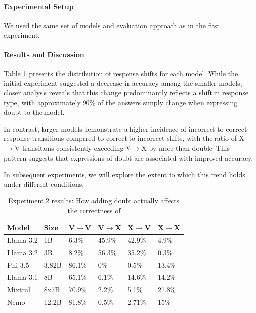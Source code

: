 \paragraph{Experimental Setup}
We used the same set of models and evaluation approach as in the first experiment.

\paragraph{Results and Discussion}

Table \ref{tab:accuracy_deep_dive} presents the distribution of response shifts for each model. While the initial experiment suggested a decrease in accuracy among the smaller models, closer analysis reveals that this change predominantly reflects a shift in response type, with approximately 90\% of the answers simply change when expressing doubt to the model.

In contrast, larger models demonstrate a higher incidence of incorrect-to-correct response transitions compared to correct-to-incorrect shifts, with the ratio of X$\rightarrow$V transitions consistently exceeding V$\rightarrow$X by more than double. This pattern suggests that expressions of doubt are associated with improved accuracy.

In subsequent experiments, we will explore the extent to which this trend holds under different conditions.

\begin{table}[h]
    \centering
    \small %
    \begin{tabular}{|l|l|l|l|l|l|}
        \hline
        \textbf{Model} & \textbf{Size} & \textbf{V$\rightarrow$V} & \textbf{V$\rightarrow$X} & \textbf{X$\rightarrow$V} & \textbf{X$\rightarrow$X} \\
        \hline
        Llama 3.2 & 1B  & 6.3\% & 45.9\% & 42.9\% & 4.9\%\\
        Llama 3.2 & 3B & 8.2\% & 56.3\% & 35.2\% & 0.3\%\\
        Phi 3.5 & 3.82B & 86.1\% & 0\% & 0.5\% & 13.4\%\\
        Llama 3.1 & 8B & 65.1\% & 6.1\% & 14.6\% & 14.2\% \\
        Mixtral & 8x7B &70.9\% & 2.2\% & 5.1\% & 21.8\% \\
        Nemo & 12.2B & 81.8\% & 0.5\% & 2.71\% & 15\%\\
        \hline
    \end{tabular}
    \caption{Experiment 2 results: How adding doubt actually affects the correctness of}
    \label{tab:accuracy_deep_dive}
\end{table}


